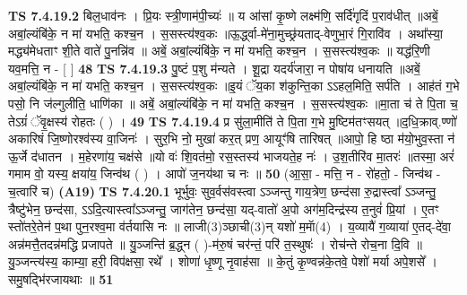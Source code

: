 \documentclass[17pt]{extarticle}
\begin{document}
                                \textbf{ TS 7.4.19.2} \newline
                  बिल॒धाव॑नः । प्रि॒यः स्त्री॒णाम॑पी॒च्यः॑ ॥ य आ॑सां कृ॒ष्णे लक्ष्म॑णि॒ सर्दि॑गृदिं प॒राव॑धीत् ॥अबें॒ अबां॒ल्यंबि॑के॒ न मा॑ यभति॒ कश्च॒न । स॒सस्त्य॑श्व॒कः ॥ऊ॒र्द्ध्वा-मे॑ना॒मुच्छ्र॑यताद्-वेणुभा॒रं गि॒रावि॑व । अथा᳚स्या॒ मद्ध्य॑मेधताꣳ शी॒ते वाते॑ पु॒नन्नि॑व ॥ अबें॒ अबां॒ल्यंबि॑के॒ न मा॑ यभति॒ कश्च॒न । स॒सस्त्य॑श्व॒कः ॥ यद्ध॑रि॒णी यव॒मत्ति॒ न - [  ] \textbf{  48} \newline
                  \newline
                                \textbf{ TS 7.4.19.3} \newline
                  पु॒ष्टं प॒शु म॑न्यते । शू॒द्रा यदर्य॑जारा॒ न पोषा॑य धनायति ॥अबें॒ अबां॒ल्यंबि॑के॒ न मा॑ यभति॒ कश्च॒न । स॒सस्त्य॑श्व॒कः ॥इ॒यं ॅय॒का श॑कुन्ति॒का ऽऽहल॒मिति॒ सर्प॑ति । आह॑तं ग॒भे पसो॒ नि ज॑ल्गुलीति॒ धाणि॑का ॥ अबें॒ अबां॒ल्यंबि॑के॒ न मा॑ यभति॒ कश्च॒न । स॒सस्त्य॑श्व॒कः ॥मा॒ता च॑ ते पि॒ता च॒ तेऽग्रं॑ ॅवृ॒क्षस्य॑ रोहतः ( ) । \textbf{  49} \newline
                  \newline
                                \textbf{ TS 7.4.19.4} \newline
                  प्र सु॑ला॒मीति॑ ते पि॒ता ग॒भे मु॒ष्टिम॑तꣳसयत् ॥द॒धि॒क्राव्.ण्णो॑ अकारिषं जि॒ष्णोरश्व॑स्य वा॒जिनः॑ । सुर॒भि नो॒ मुखा॑ कर॒त् प्रण॒ आयूꣳ॑षि तारिषत् ॥आपो॒ हि ष्ठा म॑यो॒भुव॒स्ता न॑ ऊ॒र्जे द॑धातन । म॒हेरणा॑य॒ चक्ष॑से ॥यो वः॑ शि॒वत॑मो॒ रस॒स्तस्य॑ भाजयते॒ह नः॑ । उ॒श॒तीरि॑व मा॒तरः॑ ॥तस्मा॒ अरं॑ गमाम वो॒ यस्य॒ क्षया॑य॒ जिन्व॑थ ( ) । आपो॑ ज॒नय॑था च नः ॥ \textbf{  50} \newline
                  \newline
                      (आ॒सा॒ - मत्ति॒ न - रो॑हतो॒ - जिन्व॑थ - च॒त्वारि॑ च)  \textbf{(A19)} \newline \newline
                                        \textbf{ TS 7.4.20.1} \newline
                  भूर्भुवः॒ सुव॒र्वस॑वस्त्वा ऽञ्जन्तु गाय॒त्रेण॒ छन्द॑सा रु॒द्रास्त्वा᳚ ऽञ्जन्तु॒ त्रैष्टु॑भेन॒ छन्द॑सा, ऽऽदि॒त्यास्त्वा᳚ऽञ्जन्तु॒ जाग॑तेन॒ छन्द॑सा॒ यद्-वातो॑ अ॒पो अग॑म॒दिन्द्र॑स्य त॒नुवं॑ प्रि॒यां । ए॒तꣳ स्तो॑तरे॒तेन॑ प॒था पुन॒रश्व॒मा व॑र्तयासि नः ॥ लाजी(3)ञ्छाची(3)न् यशो॑ म॒माॅ(4) । य॒व्यायै॑ ग॒व्याया॑ ए॒तद्-दे॑वा॒ अन्न॑मत्तै॒तदन्न॑मद्धि प्रजापते ॥ यु॒ञ्जन्ति॑ ब्र॒द्ध्न ( )-म॑रु॒षं चर॑न्तं॒ परि॑ त॒स्थुषः॑ । रोच॑न्ते रोच॒ना दि॒वि ॥ यु॒ञ्जन्त्य॑स्य॒ काम्या॒ हरी॒ विप॑क्षसा॒ रथे᳚ । शोणा॑ धृ॒ष्णू नृ॒वाह॑सा ॥ के॒तुं कृ॒ण्वन्न॑के॒तवे॒ पेशो॑ मर्या अपे॒शसे᳚ । समु॒षद्भि॑रजायथाः ॥ \textbf{  51} \newline
\end{document}
